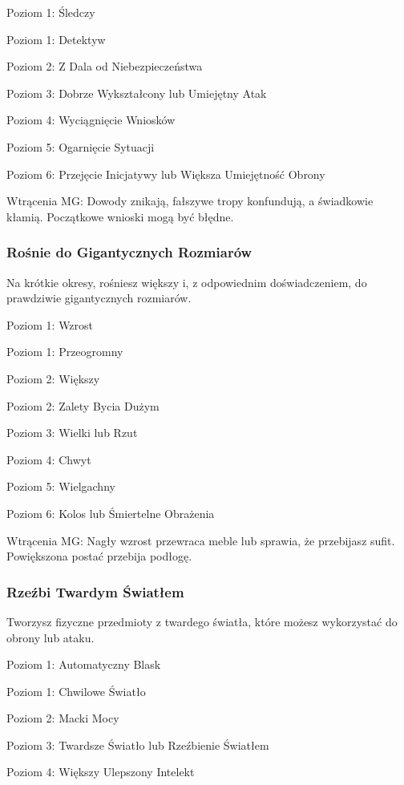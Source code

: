 Poziom 1: Śledczy

Poziom 1: Detektyw

Poziom 2: Z Dala od Niebezpieczeństwa

Poziom 3: Dobrze Wykształcony lub Umiejętny Atak

Poziom 4: Wyciągnięcie Wniosków

Poziom 5: Ogarnięcie Sytuacji

Poziom 6: Przejęcie Inicjatywy lub Większa Umiejętność Obrony

Wtrącenia MG: Dowody znikają, fałszywe tropy konfundują, a świadkowie kłamią. Początkowe wnioski mogą być błędne.

\subsubsection{Rośnie do Gigantycznych Rozmiarów}

Na krótkie okresy, rośniesz większy i, z odpowiednim doświadczeniem, do prawdziwie gigantycznych rozmiarów.

Poziom 1: Wzrost

Poziom 1: Przeogromny

Poziom 2: Większy

Poziom 2:  Zalety Bycia Dużym

Poziom 3: Wielki lub Rzut

Poziom 4: Chwyt

Poziom 5: Wielgachny

Poziom 6: Kolos lub Śmiertelne Obrażenia

Wtrącenia MG: Nagły wzrost przewraca meble lub sprawia, że przebijasz sufit. Powiększona postać przebija podłogę. 

\subsubsection{Rzeźbi Twardym Światłem}

Tworzysz fizyczne przedmioty z twardego światła, które możesz wykorzystać do obrony lub ataku.

Poziom 1: Automatyczny Blask

Poziom 1: Chwilowe Światło

Poziom 2: Macki Mocy

Poziom 3: Twardsze Światło lub Rzeźbienie Światłem

Poziom 4: Większy Ulepszony Intelekt

